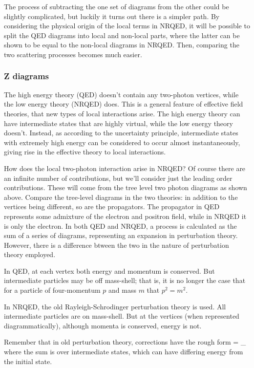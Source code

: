 The process of subtracting the one set of diagrams from the other could be slightly complicated, but luckily it turns out there is a simpler path.  By considering the physical origin of the local terms in NRQED, it will be possible to split the QED diagrams into local and non-local parts, where the latter can be shown to be equal to the non-local diagrams in NRQED.  Then, comparing the two scattering processes becomes much easier.

\subsubsection{Z diagrams}
The high energy theory (QED) doesn't contain any two-photon vertices, while the low energy theory (NRQED) does.  This is a general feature of effective field theories, that new types of local interactions arise.  The high energy theory can have intermediate states that are highly virtual, while the low energy theory doesn't.  Instead, as according to the uncertainty principle, intermediate states with extremely high energy can be considered to occur almost instantaneously, giving rise in the effective theory to local interactions.

How does the local two-photon interaction arise in NRQED?  Of course there are an infinite number of contributions, but we'll consider just the leading order contributions.  These will come from the tree level two photon diagrams as shown above.  Compare the tree-level diagrams in the two theories: in addition to the vertices being different, so are the propagators.  The propagator in QED represents some admixture of the electron and positron field, while in NRQED it is only the electron.
In both QED and NRQED, a process is calculated as the sum of a series of diagrams, representing an expansion in perturbation theory.  However, there is a difference btween the two in the nature of perturbation theory employed.

In QED, at each vertex both energy and momentum is conserved.  But intermediate particles may be off mass-shell; that is, it is no longer the case that for a particle of four-momentum $p$ and mass $m$ that $p^2 = m^2$.

In NRQED, the old Rayleigh-Schrodinger perturbation theory is used.   All intermediate particles are on mass-shell.  But at the vertices (when represented diagrammatically), although momenta is conserved, energy is not.  


Remember that in old perturbation theory, corrections have the rough form
\beq
	\Delta =  \Sigma_ 
\eeq
where the sum is over intermediate states, which can have differing energy from the initial state.

